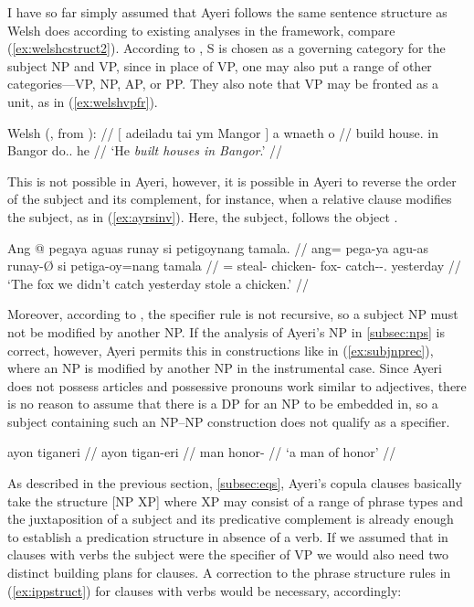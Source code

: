 I have so far simply assumed that Ayeri follows the same sentence structure as
Welsh does according to existing analyses in the \Lfg{} framework, compare 
(\ref{ex:welshcstruct2}). According to \citet[130]{bresnan2016}, S is chosen as
a governing category for the subject NP and VP, since in place of VP, one may
also put a range of other categories—VP, NP, AP, or PP. They also note that VP
may be fronted as a unit, as in (\ref{ex:welshvpfr}).

\ex\label{ex:welshvpfr}\begingl
	\glpreamble Welsh (\cite[131]{bresnan2016}, from
		\cite[245]{tallerman1998}): //
	\gla $[$ adeiladu tai ym Mangor $]$ a wnaeth o //
	\glb {} build house.\Pl{} in Bangor {} \Ptcl{} do.\Pst{}.\Tsg{} he //
	\glft `He \emph{built houses in Bangor}.' //
\endgl\xe

This is not possible in Ayeri, however, it is possible in Ayeri to reverse the
order of the subject and its complement, for instance, when a relative clause
modifies the subject, as in (\ref{ex:ayrsinv}). Here, the subject,  follows the object
.

\ex\label{ex:ayrsinv}\begingl
	\gla Ang @ pegaya aguas runay si petigoynang tamala. //
	\glb ang= pega-ya agu-as runay-Ø si petiga-oy=nang tamala //
	\glc \AgtT{}= steal-\TsgM{} chicken-\Parg{} fox-\Top{} \Rel{}
		catch-\Neg{}-\Fpl {}.\Aarg{} yesterday //
	\glft `The fox we didn't catch yesterday stole a chicken.' //
\endgl\xe

Moreover, according to \citep{carnie2013}, the specifier rule is not recursive,
so a subject NP must not be modified by another NP. If the analysis of Ayeri's
NP in \autoref{subsec:nps} is correct, however, Ayeri permits this in
constructions like in (\ref{ex:subjnprec}), where an NP is modified by another
NP in the instrumental case. Since Ayeri does not possess articles and
possessive pronouns work similar to adjectives, there is no reason to assume
that there is a DP for an NP to be embedded in, so a subject containing such an
NP--NP construction does not qualify as a specifier.

\ex\label{ex:subjnprec}\begingl
	\gla ayon tiganeri //
	\glb ayon tigan-eri //
	\glc man honor-\Ins{} //
	\glft `a man of honor' //
\endgl\xe

As described in the previous section, \ref{subsec:eqs}, Ayeri's copula clauses
basically take the structure [NP XP] where XP may consist of a range of phrase
types and the juxtaposition of a subject and its predicative complement is
already enough to establish a predication structure in absence of a verb. If we
assumed that in clauses with verbs the subject were the specifier of VP we
would also need two distinct building plans for clauses. A correction to the
phrase structure rules in (\ref{ex:ippstruct}) for clauses with verbs would be
necessary, accordingly:

